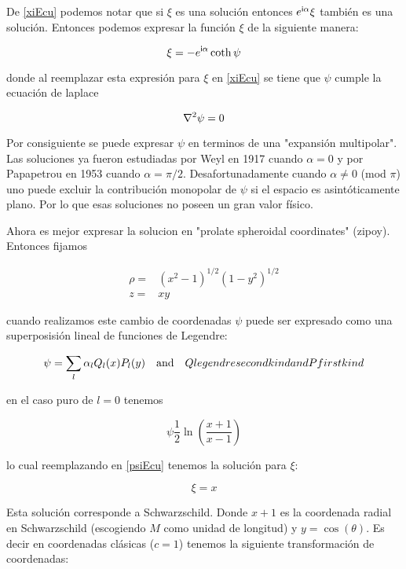 \documentclass[../Main.tex]{subfiles}
\begin{document}
De \eqref{xiEcu} podemos notar que si $\xi$ es una solución entonces $e^{\mathsf{i}\alpha}\xi$ también es una solución. Entonces podemos expresar la función $\xi$ de la siguiente manera:

\begin{equation}
    \xi=-e^{\mathsf{i}\alpha}\coth{\psi}
    \label{psiEcu}
\end{equation}

donde al reemplazar esta expresión para $\xi$ en \eqref{xiEcu} se tiene que $\psi$ cumple la ecuación de laplace

\begin{equation}
    \laplacian{\psi}=0
\end{equation}

Por consiguiente se puede expresar $\psi$ en terminos de una "expansión multipolar". Las soluciones ya fueron estudiadas por Weyl en 1917 cuando $\alpha=0$ y por Papapetrou en 1953 cuando $\alpha=\pi/2$. Desafortunadamente cuando $\alpha \neq 0$ (mod $\pi$) uno puede excluir la contribución monopolar de $\psi$ si el espacio es asintóticamente plano. Por lo que esas soluciones no poseen un gran valor físico.

Ahora es mejor expresar la solucion en "prolate spheroidal coordinates" (zipoy). Entonces fijamos

\begin{eqnarray}
    \rho= & (x^2-1)^{1/2}(1-y^{2})^{1/2} \\
    z = & xy
\end{eqnarray}

cuando realizamos este cambio de coordenadas $\psi$ puede ser expresado como una superposisión lineal de funciones de Legendre:

\begin{equation}
    \psi=\sum_{l}\alpha_{l}Q_{l}(x)P_l(y) \qand{Q legendre second kind and P first kind}
\end{equation}

en el caso puro de $l=0$ tenemos

\begin{equation}
    \psi\frac{1}{2}\ln(\dfrac{x+1}{x-1})
\end{equation}

lo cual reemplazando en \eqref{psiEcu} tenemos la solución para $\xi$:

\begin{equation}
    \xi = x
\end{equation}

Esta solución corresponde a Schwarzschild. Donde $x+1$ es la coordenada radial en Schwarzschild (escogiendo $M$ como unidad de longitud) y $y=\cos(\theta)$. Es decir en coordenadas clásicas ($c=1$) tenemos la siguiente transformación de coordenadas:
\end{document}
